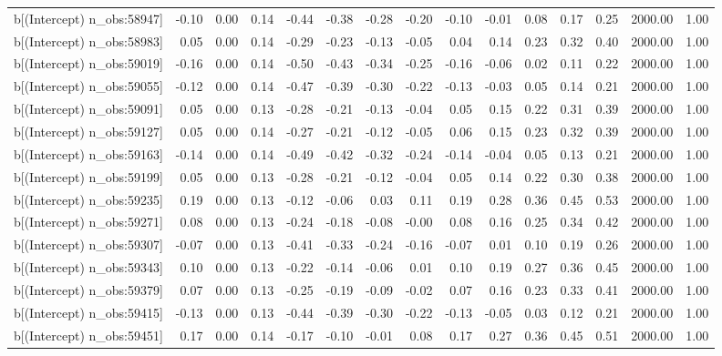 \begin{table}[ht]
\begin{tabular}{rrrrrrrrrrrrrrr}
  b[(Intercept) n\_obs:58947] & -0.10 & 0.00 & 0.14 & -0.44 & -0.38 & -0.28 & -0.20 & -0.10 & -0.01 & 0.08 & 0.17 & 0.25 & 2000.00 & 1.00 \\ 
  b[(Intercept) n\_obs:58983] & 0.05 & 0.00 & 0.14 & -0.29 & -0.23 & -0.13 & -0.05 & 0.04 & 0.14 & 0.23 & 0.32 & 0.40 & 2000.00 & 1.00 \\ 
  b[(Intercept) n\_obs:59019] & -0.16 & 0.00 & 0.14 & -0.50 & -0.43 & -0.34 & -0.25 & -0.16 & -0.06 & 0.02 & 0.11 & 0.22 & 2000.00 & 1.00 \\ 
  b[(Intercept) n\_obs:59055] & -0.12 & 0.00 & 0.14 & -0.47 & -0.39 & -0.30 & -0.22 & -0.13 & -0.03 & 0.05 & 0.14 & 0.21 & 2000.00 & 1.00 \\ 
  b[(Intercept) n\_obs:59091] & 0.05 & 0.00 & 0.13 & -0.28 & -0.21 & -0.13 & -0.04 & 0.05 & 0.15 & 0.22 & 0.31 & 0.39 & 2000.00 & 1.00 \\ 
  b[(Intercept) n\_obs:59127] & 0.05 & 0.00 & 0.14 & -0.27 & -0.21 & -0.12 & -0.05 & 0.06 & 0.15 & 0.23 & 0.32 & 0.39 & 2000.00 & 1.00 \\ 
  b[(Intercept) n\_obs:59163] & -0.14 & 0.00 & 0.14 & -0.49 & -0.42 & -0.32 & -0.24 & -0.14 & -0.04 & 0.05 & 0.13 & 0.21 & 2000.00 & 1.00 \\ 
  b[(Intercept) n\_obs:59199] & 0.05 & 0.00 & 0.13 & -0.28 & -0.21 & -0.12 & -0.04 & 0.05 & 0.14 & 0.22 & 0.30 & 0.38 & 2000.00 & 1.00 \\ 
  b[(Intercept) n\_obs:59235] & 0.19 & 0.00 & 0.13 & -0.12 & -0.06 & 0.03 & 0.11 & 0.19 & 0.28 & 0.36 & 0.45 & 0.53 & 2000.00 & 1.00 \\ 
  b[(Intercept) n\_obs:59271] & 0.08 & 0.00 & 0.13 & -0.24 & -0.18 & -0.08 & -0.00 & 0.08 & 0.16 & 0.25 & 0.34 & 0.42 & 2000.00 & 1.00 \\ 
  b[(Intercept) n\_obs:59307] & -0.07 & 0.00 & 0.13 & -0.41 & -0.33 & -0.24 & -0.16 & -0.07 & 0.01 & 0.10 & 0.19 & 0.26 & 2000.00 & 1.00 \\ 
  b[(Intercept) n\_obs:59343] & 0.10 & 0.00 & 0.13 & -0.22 & -0.14 & -0.06 & 0.01 & 0.10 & 0.19 & 0.27 & 0.36 & 0.45 & 2000.00 & 1.00 \\ 
  b[(Intercept) n\_obs:59379] & 0.07 & 0.00 & 0.13 & -0.25 & -0.19 & -0.09 & -0.02 & 0.07 & 0.16 & 0.23 & 0.33 & 0.41 & 2000.00 & 1.00 \\ 
  b[(Intercept) n\_obs:59415] & -0.13 & 0.00 & 0.13 & -0.44 & -0.39 & -0.30 & -0.22 & -0.13 & -0.05 & 0.03 & 0.12 & 0.21 & 2000.00 & 1.00 \\ 
  b[(Intercept) n\_obs:59451] & 0.17 & 0.00 & 0.14 & -0.17 & -0.10 & -0.01 & 0.08 & 0.17 & 0.27 & 0.36 & 0.45 & 0.51 & 2000.00 & 1.00 \\ 

\end{tabular}
\end{table}
